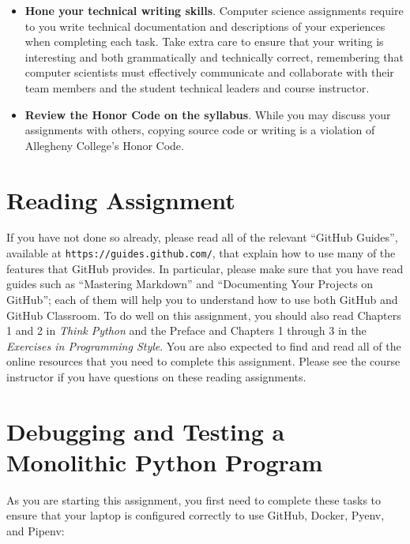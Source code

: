 \documentclass[11pt]{article}
\newcommand{\url}[1]{\lstinline{#1}}
\begin{document}
\begin{itemize}
\item {\bf Hone your technical writing skills}. Computer science assignments
  require to you write technical documentation and descriptions of your
  experiences when completing each task. Take extra care to ensure that your
  writing is interesting and both grammatically and technically correct,
  remembering that computer scientists must effectively communicate and
  collaborate with their team members and the student technical leaders and
  course instructor.

\item {\bf Review the Honor Code on the syllabus}. While you may discuss your
  assignments with others, copying source code or writing is a violation of
  Allegheny College's Honor Code.

\end{itemize}

\section*{Reading Assignment}

If you have not done so already, please read all of the relevant ``GitHub
Guides'', available at \url{https://guides.github.com/}, that explain how to use
many of the features that GitHub provides. In particular, please make sure that
you have read guides such as ``Mastering Markdown'' and ``Documenting Your
Projects on GitHub''; each of them will help you to understand how to use both
GitHub and GitHub Classroom. To do well on this assignment, you should also read
Chapters 1 and 2 in {\em Think Python\/} and the Preface and Chapters 1 through
3 in the {\em Exercises in Programming Style\/}.
%
You are also expected to find and read all of the online resources that
you need to complete this assignment.
%
Please see the course instructor if you have questions on these reading
assignments.

\section*{Debugging and Testing a Monolithic Python Program}

As you are starting this assignment, you first need to complete these tasks to
ensure that your laptop is configured correctly to use GitHub, Docker, Pyenv,
and Pipenv:
\end{document}
